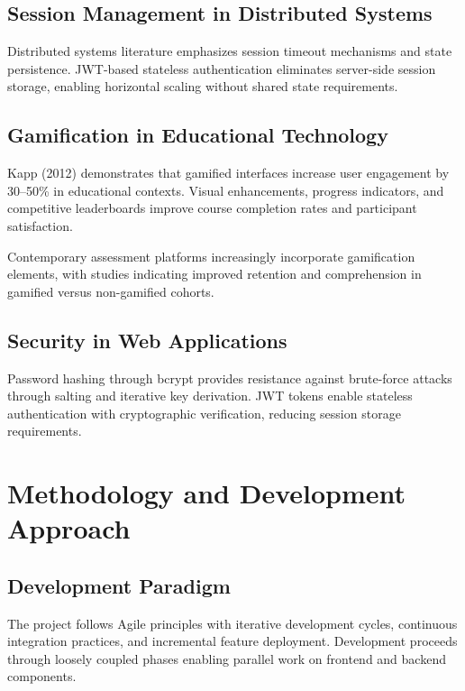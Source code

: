 \documentclass[12pt,a4paper]{report}
\begin{document}
\section{Session Management in Distributed Systems}

Distributed systems literature emphasizes session timeout mechanisms and state persistence. JWT-based stateless authentication eliminates server-side session storage, enabling horizontal scaling without shared state requirements.

\section{Gamification in Educational Technology}

Kapp (2012) demonstrates that gamified interfaces increase user engagement by 30--50\% in educational contexts. Visual enhancements, progress indicators, and competitive leaderboards improve course completion rates and participant satisfaction.

Contemporary assessment platforms increasingly incorporate gamification elements, with studies indicating improved retention and comprehension in gamified versus non-gamified cohorts.

\section{Security in Web Applications}

Password hashing through bcrypt provides resistance against brute-force attacks through salting and iterative key derivation. JWT tokens enable stateless authentication with cryptographic verification, reducing session storage requirements.

\cleardoublepage


\chapter{Methodology and Development Approach}

\section{Development Paradigm}

The project follows Agile principles with iterative development cycles, continuous integration practices, and incremental feature deployment. Development proceeds through loosely coupled phases enabling parallel work on frontend and backend components.
\end{document}
